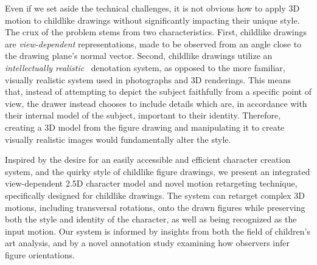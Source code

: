 
Even if we set aside the technical challenges, it is not obvious how to apply 3D motion to childlike drawings without significantly impacting their unique style. The crux of the problem stems from two characteristics. First, childlike drawings are \textit{view-dependent} representations, made to be observed from an angle close to the drawing plane's normal vector. Second, childlike drawings utilize an \textit{intellectually realistic}~\cite{luquet2001children} denotation system, as opposed to the more familiar, visually realistic system used in photographs and 3D renderings. This means that, instead of attempting to depict the subject faithfully from a specific point of view, the drawer instead chooses to include details which are, in accordance with their internal model of the subject, important to their identity. Therefore, creating a 3D model from the figure drawing and manipulating it to create visually realistic images would fundamentally alter the style.

Inspired by the desire for an easily accessible and efficient character creation system, and the quirky style of childlike figure drawings, we present an integrated view-dependent 2.5D character model and novel motion retargeting technique, specifically designed for childlike drawings. The system can retarget complex 3D motions, including transversal rotations, onto the drawn figures while preserving both the style and identity of the character, as well as being recognized as the input motion. Our system is informed by insights from both the field of children's art analysis, and by a novel annotation study examining how observers infer figure orientations.

